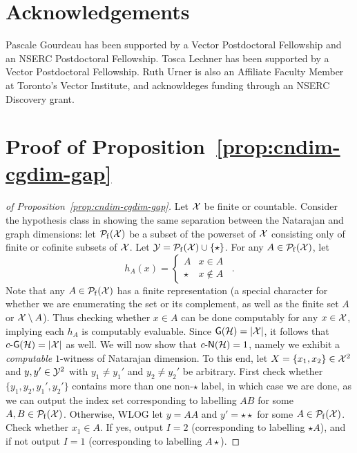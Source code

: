 \documentclass[11pt]{article}
\begin{document}
\section*{Acknowledgements}
{Pascale Gourdeau has been supported by a Vector Postdoctoral Fellowship and an NSERC Postdoctoral Fellowship. Tosca Lechner has been supported by a Vector Postdoctoral Fellowship. Ruth Urner is also an Affiliate Faculty Member at Toronto's Vector Institute, and acknowldeges funding through an NSERC Discovery grant.}




\appendix




\section{Proof of Proposition~\ref{prop:cndim-cgdim-gap}}
\label{appx:cndim-cgdim-gap}

\begin{proof}[of Proposition~\ref{prop:cndim-cgdim-gap}]
    Let $\mathcal{X}$ be finite or countable. 
    Consider the hypothesis class in \cite{daniely2015multiclass} showing the same separation between the Natarajan and graph dimensions: let $\mathcal{P}_\mathrm{f}(\mathcal{X})$ be a subset of the powerset of $\mathcal{X}$ consisting only of finite or cofinite subsets of $\mathcal{X}$. 
    Let $\mathcal{Y}=\mathcal{P}_\mathrm{f}(\mathcal{X})\cup\{\star\}$.
    For any $A\in \mathcal{P}_\mathrm{f}(\mathcal{X})$, let 
    $$h_A(x)=\begin{cases}
        A & x\in A\\
        \star & x\notin A
    \end{cases}\enspace.$$
    Note that any $A\in\mathcal{P}_\mathrm{f}(\mathcal{X})$ has a finite representation (a special character for whether we are enumerating the set or its complement, as well as the finite set $A$ or $\mathcal{X}\setminus A$).
    Thus checking whether $x\in A$ can be done computably for any $x\in\mathcal{X}$, implying each $h_A$ is computably evaluable.  
    Since $\mathsf{G}(\mathcal{H})=|\mathcal{X}|$, it follows that $c\text{-}\mathsf{G}(\mathcal{H})=|\mathcal{X}|$ as well.
    We will now show that $c\text{-}\mathsf{N}(\mathcal{H})=1$, namely we exhibit a \emph{computable} $1$-witness of Natarajan dimension. 
    To this end, let $X=\{x_1,x_2\}\in\mathcal{X}^2$ and $y,y'\in\mathcal{Y}^2$ with $y_1\neq y _1'$ and $y_2\neq y_2'$ be arbitrary.
    First check whether $\{y_1, y_2, y_1', y_2' \}$ contains more than one non-$\star$ label, in which case we are done, as we can output the index set corresponding to  labelling $AB$ for some $A,B\in\mathcal{P}_\mathrm{f}(\mathcal{X})$.
    Otherwise, WLOG let $y=AA$ and $y'=\star\star$ for some $A\in\mathcal{P}_\mathrm{f}(\mathcal{X})$.
    Check whether $x_1\in A$.
    If yes, output $I=2$ (corresponding to labelling $\star A$), and if not output $I=1$ (corresponding to labelling $A\star$).
\end{proof}
\end{document}

